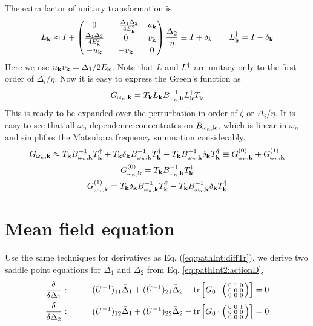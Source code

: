 The extra factor of unitary transformation is 
\begin{equation}\label{eq:pathInt2:L1}
L_{\mathbf{k}}\approx{}I+
\begin{pmatrix}0&-\frac{\Delta_{1}{}\Delta_{2}{}}{4E^{2}_{\mathbf{k}}}&u_{\mathbf{k}}\\
\frac{\Delta_{1}{}\Delta_{2}{}}{4E^{2}_{\mathbf{k}}}&0&v_{\mathbf{k}}\\
-u_{\mathbf{k}}&-v_{\mathbf{k}}&0
\end{pmatrix}\frac{\Delta_{2}{}}{\eta}
\equiv{}I+\delta_{k}\qquad
L^{\dagger}_{\mathbf{k}}=I-\delta_{\mathbf{k}}
\end{equation}
Here we use $u_{\mathbf{k}}v_{\mathbf{k}}=\Delta_{1}/2E_{\mathbf{k}}$.    Note that $L$ and $L^{\dagger}$ are unitary only to the first order of $\Delta_{i}/\eta$.
Now it is easy to express the Green's function as
\begin{equation}
G_{\omega_{n},\mathbf{k}}=T_{\mathbf{k}}L_{\mathbf{k}}B_{\omega_{n},\mathbf{k}}^{-1}L_{\mathbf{k}}^{\dagger}T_{\mathbf{k}}^{\dagger}
\end{equation}
This is ready to be expanded over the perturbation in order of  $\zeta$ or $\Delta_{i}/\eta$.  It is easy to see that all $\omega_{n}$ dependence concentrates on $B_{\omega_{n},\mathbf{k}}$, which is linear in $\omega_{n}$  and simplifies the Matsubara frequency summation considerably.   
\begin{subequations}\label{eq:pathInt2:Gexpand}
\begin{gather}
G_{\omega_{n},\mathbf{k}}\approx{}T_{\mathbf{k}}B_{\omega_{n},\mathbf{k}}^{-1}T_{\mathbf{k}}^{\dagger}+T_{\mathbf{k}}\delta_{\mathbf{k}}B_{\omega_{n},\mathbf{k}}^{-1}T_{\mathbf{k}}^{\dagger}
	-T_{\mathbf{k}}B_{\omega_{n},\mathbf{k}}^{-1}\delta_{\mathbf{k}}T_{\mathbf{k}}^{\dagger}
	\equiv{}G_{\omega_{n},\mathbf{k}}^{(0)}+G_{\omega_{n},\mathbf{k}}^{(1)}\\
	G_{\omega_{n},\mathbf{k}}^{(0)}=T_{\mathbf{k}}B_{\omega_{n},\mathbf{k}}^{-1}T_{\mathbf{k}}^{\dagger}\\
	G_{\omega_{n},\mathbf{k}}^{(1)}=T_{\mathbf{k}}\delta_{\mathbf{k}}B_{\omega_{n},\mathbf{k}}^{-1}T_{\mathbf{k}}^{\dagger}
	-T_{\mathbf{k}}B_{\omega_{n},\mathbf{k}}^{-1}\delta_{\mathbf{k}}T_{\mathbf{k}}^{\dagger}
\end{gather}
\end{subequations}

\section{Mean field equation \label{sec:pathInt2:meanfield}}
Use the same techniques for derivatives as Eq. (\ref{eq:pathInt:diffTr}), we derive two saddle point equations for $\Delta_{1}$ and $\Delta_{2}$ from Eq. \eqref{eq:pathInt2:actionD},
 \begin{align}
\frac{\delta}{\delta{}\Delta_{1}}:&\qquad&
(\tilde{U}^{-1})_{11}\bar{\Delta}_{1}+(\tilde{U}^{-1})_{21}\bar{\Delta}_{2}-\text{tr}\left[{G_{0}}\cdot\left(\begin{smallmatrix}0&1&0\\0&0&0\\0&0&0\end{smallmatrix}\right)\right]=0
\label{eq:pathInt2:mf01}\\
\frac{\delta}{\delta{}\Delta_{2}}:&\qquad&
(\tilde{U}^{-1})_{12}\bar{\Delta}_{1}+(\tilde{U}^{-1})_{22}\bar{\Delta}_{2}-\text{tr}\left[{G_{0}}\cdot\left(\begin{smallmatrix}0&0&1\\0&0&0\\0&0&0\end{smallmatrix}\right)\right]=0
\label{eq:pathInt2:mf02}
 \end{align}
 
